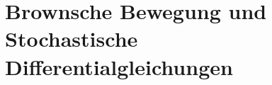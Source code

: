 %
%
%
%

\chapter{Brownsche Bewegung und Stochastische Differentialgleichungen\label{chapter:brown}}


% 

\begin{refsection}






\printbibliography[heading=subbibliography]

\end{refsection}
